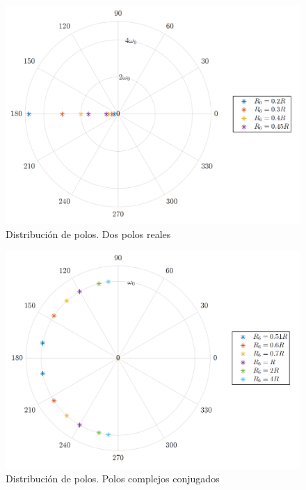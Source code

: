 \begin{figure}[ht]
\centering
\includegraphics[scale=0.5]{../parte1/informe/resources/1_polos_reales}
\caption{Distribución de polos. Dos polos reales}
\label{1_polos_reales}
\end{figure}

\begin{figure}[ht]
\centering
\includegraphics[scale=0.5]{../parte1/informe/resources/1_polos_complejos}
\caption{Distribución de polos. Polos complejos conjugados}
\label{1_polos_complejos}
\end{figure}

